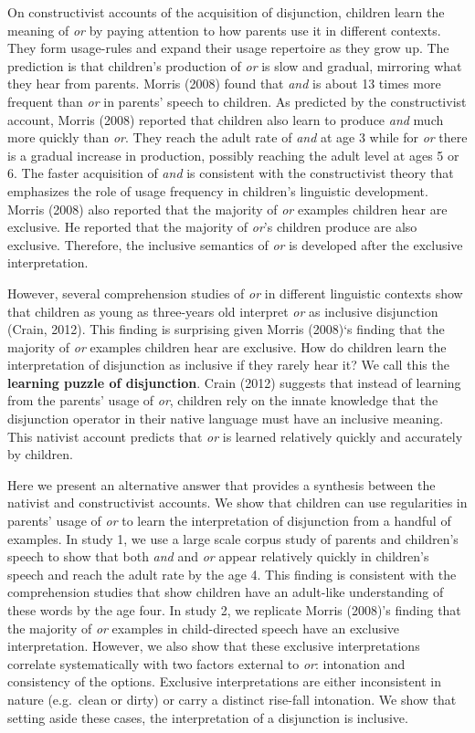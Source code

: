 \documentclass[10pt, letterpaper]{article}
\begin{document}
On constructivist accounts of the acquisition of disjunction, children
learn the meaning of \emph{or} by paying attention to how parents use it
in different contexts. They form usage-rules and expand their usage
repertoire as they grow up. The prediction is that children's production
of \emph{or} is slow and gradual, mirroring what they hear from parents.
Morris (2008) found that \emph{and} is about 13 times more frequent than
\emph{or} in parents' speech to children. As predicted by the
constructivist account, Morris (2008) reported that children also learn
to produce \emph{and} much more quickly than \emph{or}. They reach the
adult rate of \emph{and} at age 3 while for \emph{or} there is a gradual
increase in production, possibly reaching the adult level at ages 5 or
6. The faster acquisition of \emph{and} is consistent with the
constructivist theory that emphasizes the role of usage frequency in
children's linguistic development. Morris (2008) also reported that the
majority of \emph{or} examples children hear are exclusive. He reported
that the majority of \emph{or}'s children produce are also exclusive.
Therefore, the inclusive semantics of \emph{or} is developed after the
exclusive interpretation.

However, several comprehension studies of \emph{or} in different
linguistic contexts show that children as young as three-years old
interpret \emph{or} as inclusive disjunction (Crain, 2012). This finding
is surprising given Morris (2008)`s finding that the majority of
\emph{or} examples children hear are exclusive. How do children learn
the interpretation of disjunction as inclusive if they rarely hear it?
We call this the \textbf{learning puzzle of disjunction}. Crain (2012)
suggests that instead of learning from the parents' usage of \emph{or},
children rely on the innate knowledge that the disjunction operator in
their native language must have an inclusive meaning. This nativist
account predicts that \emph{or} is learned relatively quickly and
accurately by children.

Here we present an alternative answer that provides a synthesis between
the nativist and constructivist accounts. We show that children can use
regularities in parents' usage of \emph{or} to learn the interpretation
of disjunction from a handful of examples. In study 1, we use a large
scale corpus study of parents and children's speech to show that both
\emph{and} and \emph{or} appear relatively quickly in children's speech
and reach the adult rate by the age 4. This finding is consistent with
the comprehension studies that show children have an adult-like
understanding of these words by the age four. In study 2, we replicate
Morris (2008)'s finding that the majority of \emph{or} examples in
child-directed speech have an exclusive interpretation. However, we also
show that these exclusive interpretations correlate systematically with
two factors external to \emph{or}: intonation and consistency of the
options. Exclusive interpretations are either inconsistent in nature
(e.g.~clean or dirty) or carry a distinct rise-fall intonation. We show
that setting aside these cases, the interpretation of a disjunction is
inclusive.
\end{document}
